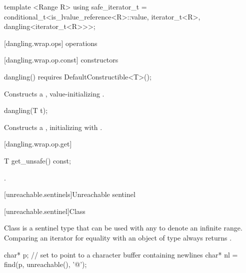 \begin{addedblock}
\begin{codeblock}
{{{{  template <Range R>
  using safe_iterator_t =
    conditional_t<is_lvalue_reference<R>::value,
      iterator_t<R>,
      dangling<iterator_t<R>>>;
}}}}
\end{codeblock}

[dangling.wrap.ops]{ operations}

[dangling.wrap.op.const]{ constructors}

%
\begin{itemdecl}
dangling() requires DefaultConstructible<T>();
\end{itemdecl}

\begin{itemdescr}
\pnum
\effects Constructs a , value-initializing .
\end{itemdescr}

%
\begin{itemdecl}
dangling(T t);
\end{itemdecl}

\begin{itemdescr}
\pnum
\effects Constructs a , initializing  with .
\end{itemdescr}

[dangling.wrap.op.get]{}

%
%
\begin{itemdecl}
T get_unsafe() const;
\end{itemdecl}

\begin{itemdescr}
\pnum
\returns {}.
\end{itemdescr}

[unreachable.sentinels]{Unreachable sentinel}

[unreachable.sentinel]{Class }

\pnum
{}%
Class  is a sentinel type that can be used with any
 to denote an infinite range. Comparing an iterator for equality with
an object of type  always returns .

\enterexample
\begin{codeblock}
char* p;
// set  to point to a character buffer containing newlines
char* nl = find(p, unreachable(), '@\textbackslash@n');
\end{codeblock}


\end{addedblock}
